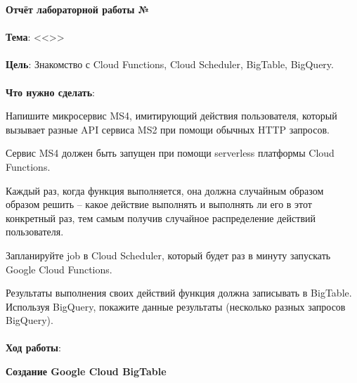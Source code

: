 \documentclass[12pt, a4paper, simple]{eskdtext}
\begin{document}
  

  \begin{center}
    \textbf{Отчёт лабораторной работы №\envReportLabNumber}
  \end{center}

  \paragraph{} \textbf{Тема}: <<\envReportTitle>>

  \paragraph{} \textbf{Цель}:
  Знакомство с Cloud Functions, Cloud Scheduler, BigTable, BigQuery.

  \paragraph{} \textbf{Что нужно сделать}:

  Напишите микросервис MS4, имитирующий действия пользователя, который вызывает разные API сервиса MS2 при помощи обычных HTTP запросов. 
  
  Сервис MS4 должен быть запущен при помощи serverless платформы Cloud Functions. 
  
  Каждый раз, когда функция выполняется, она должна случайным образом образом решить – какое действие выполнять и выполнять ли его в этот конкретный раз, тем самым получив случайное распределение действий пользователя.
  

  Запланируйте job в Cloud Scheduler, который будет раз в минуту запускать Google Cloud Functions.
  
  Результаты выполнения своих действий функция должна записывать в BigTable. Используя BigQuery, покажите данные результаты (несколько разных запросов BigQuery).
  
  \paragraph{} \textbf{Ход работы}:

  \begin{center}
    \textbf{Создание Google Cloud BigTable}
  \end{center}
\end{document}
